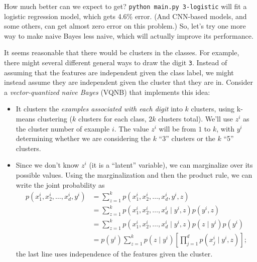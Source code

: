 \documentclass{article}
\begin{document}
How much better can we expect to get?
\texttt{python main.py 3-logistic} will fit a logistic regression model,
which gets 4.6\% error.
(And CNN-based models, and some others, can get almost zero error on this problem.)
So, let's try one more way to make naive Bayes less naive, which will actually improve its performance.

It seems reasonable that there would be clusters in the classes.
For example, there might several different general ways to draw the digit \texttt{3}.
Instead of assuming that the features are independent given the class label,
we might instead assume they are independent given the cluster that they are in.
Consider a \emph{vector-quantized naive Bayes} (VQNB) that implements this idea:
\begin{itemize}
\item
    It clusters the \emph{examples associated with each digit} into $k$ clusters, using k-means clustering
    ($k$ clusters for each class, $2k$ clusters total).
    We'll use $z^i$ as the cluster number of example $i$.
    The value $z^i$ will be from $1$ to $k$,
    with $y^i$ determining whether we are considering the $k$ ``3'' clusters or the $k$ ``5'' clusters.
\item
    Since we don't know $z^i$ (it is a ``latent'' variable),
    we can marginalize over its possible values.
    Using the marginalization and then the product rule, we can write the joint probability as
\begin{align*}
p(x_1^i, x_2^i,\dots,x_d^i, y^i) & = \sum_{z = 1}^k p(x_1^i, x_2^i,\dots,x_d^i, y^i, z)\\
& = \sum_{z=1}^k  p(x_1^i, x_2^i,\dots,x_d^i \mid y^i, z)p(y^i, z)\\
& = \sum_{z=1}^k  p(x_1^i, x_2^i,\dots,x_d^i \mid y^i, z)p(z \mid y^i)p(y^i)\\
& = p(y^i)\sum_{z=1}^k  p(z \mid y^i) \left[ \prod_{j=1}^d p(x_j^i \mid y^i, z) \right]
;\end{align*}
the last line uses independence of the features given the cluster.
\end{itemize}
\end{document}
